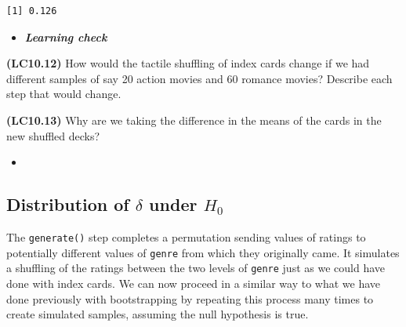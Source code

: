 \documentclass[12pt,]{krantz}
\makeatletter
\newenvironment{Shaded}{\begin{snugshade}}{\end{snugshade}}
\newcommand{\KeywordTok}[1]{\textcolor[rgb]{0.27,0.27,0.27}{\textbf{#1}}}
\newcommand{\DataTypeTok}[1]{\textcolor[rgb]{0.27,0.27,0.27}{#1}}
\newcommand{\DecValTok}[1]{\textcolor[rgb]{0.06,0.06,0.06}{#1}}
\newcommand{\StringTok}[1]{\textcolor[rgb]{0.5,0.5,0.5}{#1}}
\newcommand{\OperatorTok}[1]{\textcolor[rgb]{0.43,0.43,0.43}{\textbf{#1}}}
\newcommand{\NormalTok}[1]{#1}
\newenvironment{kframe}{%
\medskip{}
\setlength{\fboxsep}{.8em}
 \def\at@end@of@kframe{}%
 \ifinner\ifhmode%
  \def\at@end@of@kframe{\end{minipage}}%
  \begin{minipage}{\columnwidth}%
 \fi\fi%
 \def\FrameCommand##1{\hskip\@totalleftmargin \hskip-\fboxsep
 \colorbox{shadecolor}{##1}\hskip-\fboxsep
     \hskip-\linewidth \hskip-\@totalleftmargin \hskip\columnwidth}%
 \MakeFramed {\advance\hsize-\width
   \@totalleftmargin\z@ \linewidth\hsize
   \@setminipage}}%
 {\par\unskip\endMakeFramed%
 \at@end@of@kframe}
\renewenvironment{Shaded}{\begin{kframe}}{\end{kframe}}
\newenvironment{rmdblock}[1]
  {\begin{shaded*}
  \begin{itemize}
  \renewcommand{\labelitemi}{
    \raisebox{-.7\height}[0pt][0pt]{
    }
  }
  \item
  }
  {
  \end{itemize}
  \end{shaded*}
  }
\newenvironment{learncheck}
  {\begin{rmdblock}{warning}}
  {\end{rmdblock}}
\makeatother
\begin{document}
\begin{verbatim}
[1] 0.126
\end{verbatim}

\begin{Shaded}
\end{Shaded}

\begin{learncheck}
\textbf{\emph{Learning check}}
\end{learncheck}

\textbf{(LC10.12)} How would the tactile shuffling of index cards change
if we had different samples of say 20 action movies and 60 romance
movies? Describe each step that would change.

\textbf{(LC10.13)} Why are we taking the difference in the means of the
cards in the new shuffled decks?

\begin{learncheck}

\end{learncheck}

\subsection{\texorpdfstring{Distribution of \(\delta\) under
\(H_0\)}{Distribution of \textbackslash{}delta under H\_0}}\label{distribution-of-delta-under-h_0}

The \texttt{generate()} step completes a permutation sending values of
ratings to potentially different values of \texttt{genre} from which
they originally came. It simulates a shuffling of the ratings between
the two levels of \texttt{genre} just as we could have done with index
cards. We can now proceed in a similar way to what we have done
previously with bootstrapping by repeating this process many times to
create simulated samples, assuming the null hypothesis is true.

\begin{Shaded}
\end{Shaded}
\end{document}
